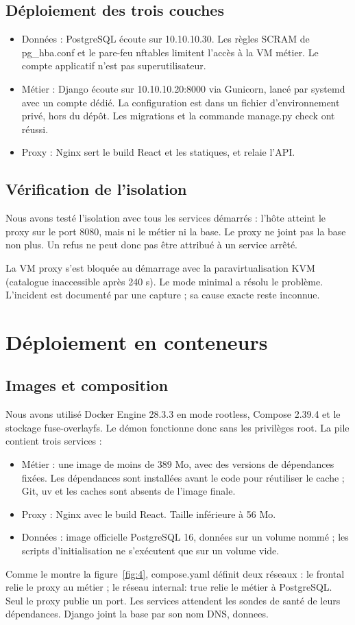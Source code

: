 \documentclass[a4paper,11pt]{article}
\begin{document}
\subsection{Déploiement des trois couches}
\begin{itemize}
\item Données : PostgreSQL écoute sur 10.10.10.30. Les règles SCRAM de pg\_hba.conf et le pare-feu nftables limitent l'accès à la VM métier. Le compte applicatif n'est pas superutilisateur.
\item Métier : Django écoute sur 10.10.10.20:8000 via Gunicorn, lancé par systemd avec un compte dédié. La configuration est dans un fichier d'environnement privé, hors du dépôt. Les migrations et la commande manage.py check ont réussi.
\item Proxy : Nginx sert le build React et les statiques, et relaie l'API.
\end{itemize}
\subsection{Vérification de l'isolation}
Nous avons testé l'isolation avec tous les services démarrés : l'hôte atteint le proxy sur le port 8080, mais ni le métier ni la base. Le proxy ne joint pas la base non plus. Un refus ne peut donc pas être attribué à un service arrêté.

La VM proxy s'est bloquée au démarrage avec la paravirtualisation KVM (catalogue inaccessible après 240 s). Le mode \og minimal\fg{} a résolu le problème. L'incident est documenté par une capture ; sa cause exacte reste inconnue.

\clearpage
\section{Déploiement en conteneurs}
\subsection{Images et composition}
Nous avons utilisé Docker Engine 28.3.3 en mode rootless, Compose 2.39.4 et le stockage fuse-overlayfs. Le démon fonctionne donc sans les privilèges root. La pile contient trois services :

\begin{itemize}
\item Métier : une image de moins de 389 Mo, avec des versions de dépendances fixées. Les dépendances sont installées avant le code pour réutiliser le cache ; Git, uv et les caches sont absents de l'image finale.
\item Proxy : Nginx avec le build React. Taille inférieure à 56 Mo.
\item Données : image officielle PostgreSQL 16, données sur un volume nommé ; les scripts d'initialisation ne s'exécutent que sur un volume vide.
\end{itemize}
Comme le montre la figure~\ref{fig:4}, compose.yaml définit deux réseaux : le frontal relie le proxy au métier ; le réseau internal: true relie le métier à PostgreSQL. Seul le proxy publie un port. Les services attendent les sondes de santé de leurs dépendances. Django joint la base par son nom DNS, donnees.
\end{document}

